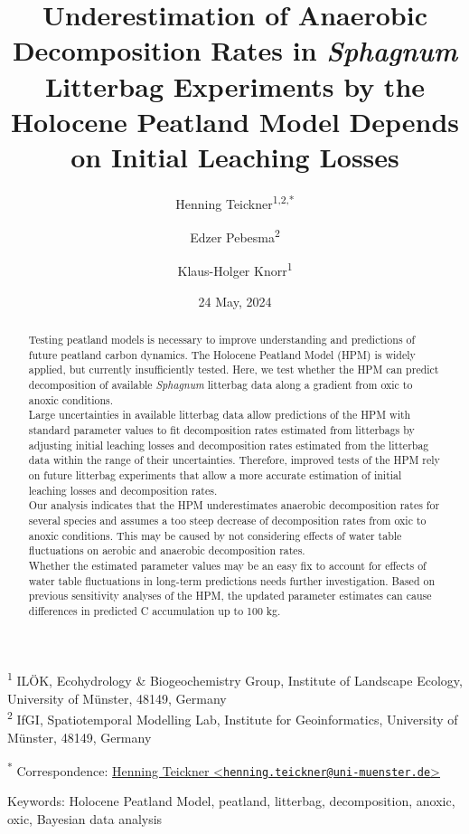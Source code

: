 \documentclass[
  12pt,
]{article}
\title{Underestimation of Anaerobic Decomposition Rates in \emph{Sphagnum} Litterbag Experiments by the Holocene Peatland Model Depends on Initial Leaching Losses}
\author{Henning Teickner\textsuperscript{1,2,*} \and Edzer Pebesma\textsuperscript{2} \and Klaus-Holger Knorr\textsuperscript{1}}
\date{24 May, 2024}
\begin{document}
\maketitle
\begin{abstract}
Testing peatland models is necessary to improve understanding and predictions of future peatland carbon dynamics. The Holocene Peatland Model (HPM) is widely applied, but currently insufficiently tested. Here, we test whether the HPM can predict decomposition of available \emph{Sphagnum} litterbag data along a gradient from oxic to anoxic conditions.\\
Large uncertainties in available litterbag data allow predictions of the HPM with standard parameter values to fit decomposition rates estimated from litterbags by adjusting initial leaching losses and decomposition rates estimated from the litterbag data within the range of their uncertainties. Therefore, improved tests of the HPM rely on future litterbag experiments that allow a more accurate estimation of initial leaching losses and decomposition rates.\\
Our analysis indicates that the HPM underestimates anaerobic decomposition rates for several species and assumes a too steep decrease of decomposition rates from oxic to anoxic conditions. This may be caused by not considering effects of water table fluctuations on aerobic and anaerobic decomposition rates.\\
Whether the estimated parameter values may be an easy fix to account for effects of water table fluctuations in long-term predictions needs further investigation. Based on previous sensitivity analyses of the HPM, the updated parameter estimates can cause differences in predicted C accumulation up to 100 kg.
\end{abstract}

\textsuperscript{1} ILÖK, Ecohydrology \& Biogeochemistry Group, Institute of Landscape Ecology, University of Münster, 48149, Germany\\
\textsuperscript{2} IfGI, Spatiotemporal Modelling Lab, Institute for Geoinformatics, University of Münster, 48149, Germany

\textsuperscript{*} Correspondence: \href{mailto:henning.teickner@uni-muenster.de}{Henning Teickner \textless{}\href{mailto:henning.teickner@uni-muenster.de}{\nolinkurl{henning.teickner@uni-muenster.de}}\textgreater{}}

Keywords: Holocene Peatland Model, peatland, litterbag, decomposition, anoxic, oxic, Bayesian data analysis
\end{document}
